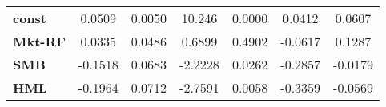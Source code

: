 \begin{center}
\begin{tabular}{lcccccc}
\midrule
\textbf{const}  &       0.0509       &       0.0050       &      10.246     &      0.0000      &       0.0412      &       0.0607       \\
\textbf{Mkt-RF} &       0.0335       &       0.0486       &      0.6899     &      0.4902      &      -0.0617      &       0.1287       \\
\textbf{SMB}    &      -0.1518       &       0.0683       &     -2.2228     &      0.0262      &      -0.2857      &      -0.0179       \\
\textbf{HML}    &      -0.1964       &       0.0712       &     -2.7591     &      0.0058      &      -0.3359      &      -0.0569       \\
\bottomrule
\end{tabular}
\end{center}
